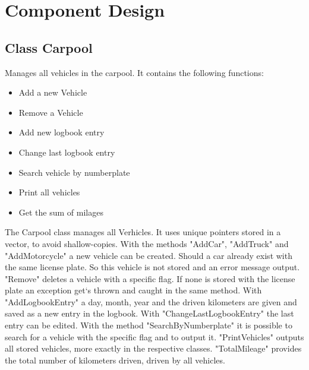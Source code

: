 \section{Component Design}

\subsection{Class Carpool}
Manages all vehicles in the carpool.
It contains the following functions:
\begin{itemize}
	\item Add a new Vehicle
	\item Remove a Vehicle
	\item Add new logbook entry
	\item Change last logbook entry
	\item Search vehicle by numberplate
	\item Print all vehicles
	\item Get the sum of milages
\end{itemize}

The Carpool class manages all Verhicles. It uses unique pointers stored in a vector, to avoid shallow-copies.
With the methods "AddCar", "AddTruck" and "AddMotorcycle" a new vehicle can be created. Should a car already exist with the same license plate. So this vehicle is not stored and an error message output.
"Remove" deletes a vehicle with a specific flag. If none is stored with the license plate an exception get`s thrown and caught in the same method.
With "AddLogbookEntry" a day, month, year and the driven kilometers are given and saved as a new entry in the logbook.
With "ChangeLastLogbookEntry" the last entry can be edited.
With the method "SearchByNumberplate" it is possible to search for a vehicle with the specific flag and to output it.
"PrintVehicles" outputs all stored vehicles, more exactly in the respective classes.
"TotalMileage" provides the total number of kilometers driven, driven by all vehicles.

